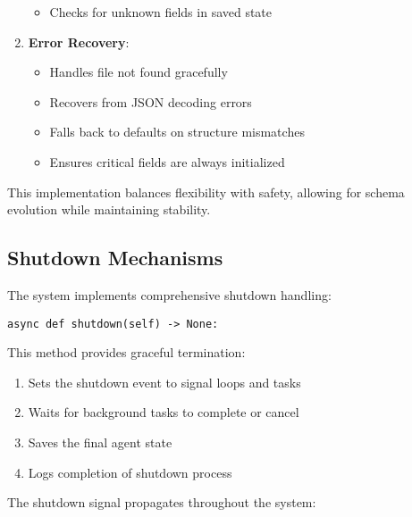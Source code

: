 \documentclass[12pt,a4paper]{article}
\begin{document}
\begin{enumerate}[label=\arabic*.]
\begin{itemize}
        \item Checks for unknown fields in saved state
    \end{itemize}
    \item \textbf{Error Recovery}:
    \begin{itemize}
        \item Handles file not found gracefully
        \item Recovers from JSON decoding errors
        \item Falls back to defaults on structure mismatches
        \item Ensures critical fields are always initialized
    \end{itemize}
\end{enumerate}

This implementation balances flexibility with safety, allowing for schema evolution while maintaining stability.

\subsection*{Shutdown Mechanisms}

The system implements comprehensive shutdown handling:
\begin{pageablecode}
\begin{verbatim}
async def shutdown(self) -> None:
\end{verbatim}
\end{pageablecode}
This method provides graceful termination:
\begin{enumerate}[label=\arabic*.]
    \item Sets the shutdown event to signal loops and tasks
    \item Waits for background tasks to complete or cancel
    \item Saves the final agent state
    \item Logs completion of shutdown process
\end{enumerate}

The shutdown signal propagates throughout the system:
\end{document}
